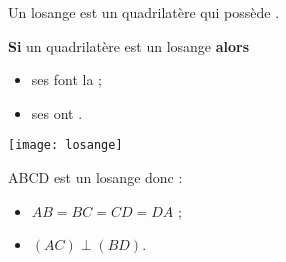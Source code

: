 \begin{mydef}
	Un losange est un quadrilatère qui possède .
\end{mydef}

\begin{myprops}
	\textbf{Si} un quadrilatère est un losange \textbf{alors} 
	\begin{itemize}
		\item ses  font la ;
		\item ses  ont .
	\end{itemize}
\end{myprops}

\begin{myex}
	\begin{center}
		\texttt{[image: losange]}
	\end{center}

	ABCD est un losange donc :
 	\begin{itemize}
 		\item $AB = BC = CD = DA$ ;
 		\item $(AC) \perp (BD)$.
 	\end{itemize}	
\end{myex}